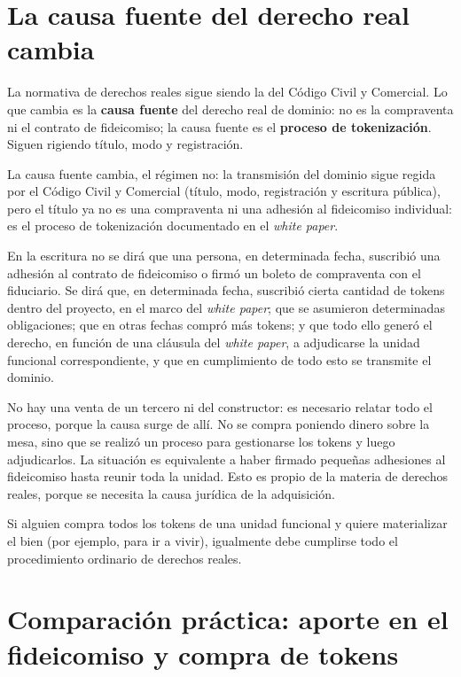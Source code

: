 \documentclass[12pt,oneside]{book}
\begin{document}
\section{La causa fuente del derecho real cambia}

La normativa de derechos reales sigue siendo la del Código Civil y Comercial. Lo que cambia es la \textbf{causa fuente} del derecho real de dominio: no es la compraventa ni el contrato de fideicomiso; la causa fuente es el \textbf{proceso de tokenización}. Siguen rigiendo título, modo y registración.

\begin{important}
La causa fuente cambia, el régimen no: la transmisión del dominio sigue regida por el Código Civil y Comercial (título, modo, registración y escritura pública), pero el título ya no es una compraventa ni una adhesión al fideicomiso individual: es el proceso de tokenización documentado en el \textit{white paper}.
\end{important}

En la escritura no se dirá que una persona, en determinada fecha, suscribió una adhesión al contrato de fideicomiso o firmó un boleto de compraventa con el fiduciario. Se dirá que, en determinada fecha, suscribió cierta cantidad de tokens dentro del proyecto, en el marco del \textit{white paper}; que se asumieron determinadas obligaciones; que en otras fechas compró más tokens; y que todo ello generó el derecho, en función de una cláusula del \textit{white paper}, a adjudicarse la unidad funcional correspondiente, y que en cumplimiento de todo esto se transmite el dominio.

No hay una venta de un tercero ni del constructor: es necesario relatar todo el proceso, porque la causa surge de allí. No se compra poniendo dinero sobre la mesa, sino que se realizó un proceso para gestionarse los tokens y luego adjudicarlos. La situación es equivalente a haber firmado pequeñas adhesiones al fideicomiso hasta reunir toda la unidad. Esto es propio de la materia de derechos reales, porque se necesita la causa jurídica de la adquisición.

Si alguien compra todos los tokens de una unidad funcional y quiere materializar el bien (por ejemplo, para ir a vivir), igualmente debe cumplirse todo el procedimiento ordinario de derechos reales.

\section{Comparación práctica: aporte en el fideicomiso y compra de tokens}
\end{document}
